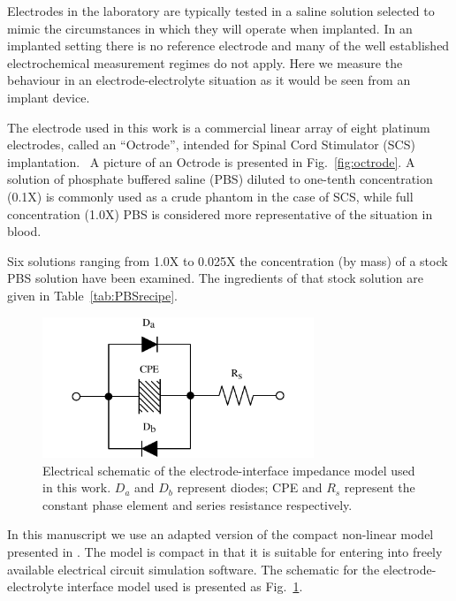 \documentclass[journal, a4paper]{IEEEtran}
\begin{document}
Electrodes in the laboratory are typically tested in a saline solution selected to mimic the circumstances in which they will operate when implanted. In an implanted setting there is no reference electrode and many of the well established electrochemical measurement regimes do not apply. Here we measure the behaviour in an electrode-electrolyte situation as it would be seen from an implant device.

The electrode used in this work is a commercial linear array of eight platinum electrodes, called an ``Octrode'', intended for Spinal Cord Stimulator (SCS) implantation.~\cite{StJudeOctrode} A picture of an Octrode is presented in Fig.~\ref{fig:octrode}. A solution of phosphate buffered saline (PBS) diluted to one-tenth concentration (0.1X) is commonly {\color{blue}used as a crude phantom} in the case of SCS, while full concentration (1.0X) PBS is considered more representative of the situation in blood.

Six solutions ranging from 1.0X to 0.025X the concentration (by mass) of a stock PBS solution have been examined.
The ingredients of that stock solution are given in Table~\ref{tab:PBSrecipe}.

{
    \color{blue}

    \begin{figure}
        \begin{center}
            \includegraphics[width=230pt]{graphics/interfaceSchematic_noMemristive}
        \end{center}
        \caption{Electrical schematic of the electrode-interface impedance model used in this work. $D_{a}$ and $D_{b}$ represent diodes; CPE and $R_{s}$ represent the constant phase element and series resistance respectively.}
        \label{fig:schematic}
    \end{figure}

    In this manuscript we use an adapted version of the compact non-linear model presented in \cite{ScottSingle2013}. The model is compact in that it is suitable for {\color{blue} entering into freely available electrical circuit simulation software}. The schematic for the {\color{blue} electrode-electrolyte interface} model used is presented as Fig.~\ref{fig:schematic}.
}
\end{document}
